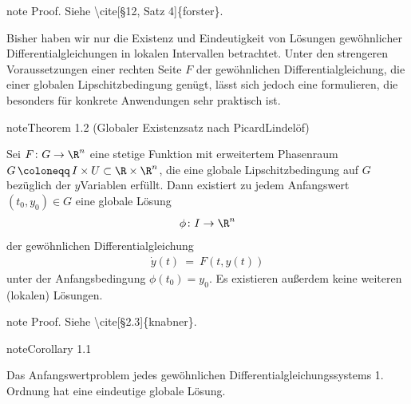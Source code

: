 \documentclass[letterpaper,10pt,english]{jupyterBook}
\begin{document}
\begin{sphinxadmonition}{note}
\sphinxAtStartPar
Proof. Siehe \textbackslash{}cite{[}§12, Satz 4{]}\{forster\}.
\end{sphinxadmonition}

\sphinxAtStartPar
Bisher haben wir nur die Existenz und Eindeutigkeit von Lösungen gewöhnlicher Differentialgleichungen in lokalen Intervallen betrachtet.
Unter den strengeren Voraussetzungen einer rechten Seite \(F\) der gewöhnlichen Differentialgleichung, die einer globalen Lipschitzbedingung genügt, lässt sich jedoch eine  formulieren, die besonders für konkrete Anwendungen sehr praktisch ist.
\label{ode/repetition:satz:picardlindeloef_lokal}
\begin{sphinxadmonition}{note}{Theorem 1.2 (Globaler Existenzsatz nach Picard\sphinxhyphen{}Lindelöf)}



\sphinxAtStartPar
Sei \(F\colon G\to\R^n\) eine stetige Funktion mit erweitertem Phasenraum \(G \, \coloneqq \, I \times U \subset \R\times\R^n\), die eine globale Lipschitzbedingung auf \(G\) bezüglich der \(y\)\sphinxhyphen{}Variablen erfüllt.
Dann existiert zu jedem Anfangswert \((t_0,y_0) \in G\) eine globale Lösung
\begin{equation*}
\begin{split}\phi \colon I \to \R^n\end{split}
\end{equation*}
\sphinxAtStartPar
der gewöhnlichen Differentialgleichung
\begin{equation*}
\begin{split}\dot{y}(t) \ = \ F(t,y(t))\end{split}
\end{equation*}
\sphinxAtStartPar
unter der Anfangsbedingung \(\phi(t_0)=y_0\).
Es existieren außerdem keine weiteren (lokalen) Lösungen.
\end{sphinxadmonition}

\begin{sphinxadmonition}{note}
\sphinxAtStartPar
Proof. Siehe \textbackslash{}cite{[}§2.3{]}\{knabner\}.
\end{sphinxadmonition}
\label{ode/repetition:corollary-11}
\begin{sphinxadmonition}{note}{Corollary 1.1}



\sphinxAtStartPar
Das Anfangswertproblem jedes  gewöhnlichen Differentialgleichungssystems 1. Ordnung hat eine eindeutige globale Lösung.
\end{sphinxadmonition}
\end{document}
